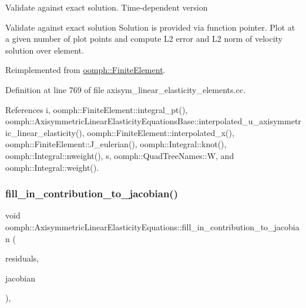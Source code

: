 Validate against exact solution. Time-\/dependent version

Validate against exact solution Solution is provided via function pointer. Plot at a given number of plot points and compute L2 error and L2 norm of velocity solution over element. 

Reimplemented from \hyperlink{classoomph_1_1FiniteElement_a7f67853506dc73fa6b7505108de22d1f}{oomph\+::\+Finite\+Element}.



Definition at line 769 of file axisym\+\_\+linear\+\_\+elasticity\+\_\+elements.\+cc.



References i, oomph\+::\+Finite\+Element\+::integral\+\_\+pt(), oomph\+::\+Axisymmetric\+Linear\+Elasticity\+Equations\+Base\+::interpolated\+\_\+u\+\_\+axisymmetric\+\_\+linear\+\_\+elasticity(), oomph\+::\+Finite\+Element\+::interpolated\+\_\+x(), oomph\+::\+Finite\+Element\+::\+J\+\_\+eulerian(), oomph\+::\+Integral\+::knot(), oomph\+::\+Integral\+::nweight(), s, oomph\+::\+Quad\+Tree\+Names\+::W, and oomph\+::\+Integral\+::weight().

\mbox{\label{classoomph_1_1AxisymmetricLinearElasticityEquations_ab773f8081f53cd71666eca2d0031ecec}} 
\subsubsection{\texorpdfstring{fill\+\_\+in\+\_\+contribution\+\_\+to\+\_\+jacobian()}{fill\_in\_contribution\_to\_jacobian()}}
{\footnotesize\ttfamily void oomph\+::\+Axisymmetric\+Linear\+Elasticity\+Equations\+::fill\+\_\+in\+\_\+contribution\+\_\+to\+\_\+jacobian (\begin{DoxyParamCaption}\item[{\hyperlink{classoomph_1_1Vector}{Vector}$<$ double $>$ \&}]{residuals,  }\item[{\hyperlink{classoomph_1_1DenseMatrix}{Dense\+Matrix}$<$ double $>$ \&}]{jacobian }\end{DoxyParamCaption})\hspace{0.3cm}{\ttfamily [inline]}, {\ttfamily [virtual]}}

